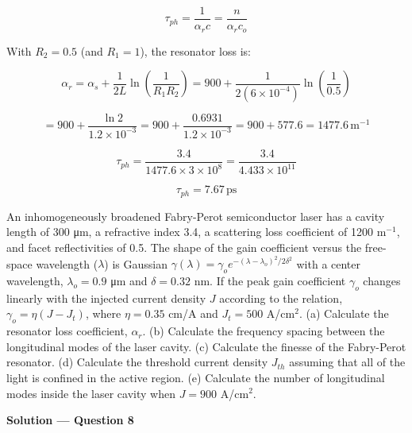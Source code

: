 \begin{equation*}
  \tau_{ph} = \frac{1}{\alpha_r c} = \frac{n}{\alpha_r c_o}
\end{equation*}

With $R_2 = 0.5$ (and $R_1 = 1$), the resonator loss is:

\begin{equation*}
  \alpha_r = \alpha_s + \frac{1}{2L}\ln\!\left(\frac{1}{R_1 R_2}\right) = 900 + \frac{1}{2(6\times10^{-4})}\ln\!\left(\frac{1}{0.5}\right)
\end{equation*}

\begin{equation*}
  = 900 + \frac{\ln 2}{1.2\times10^{-3}} = 900 + \frac{0.6931}{1.2\times10^{-3}} = 900 + 577.6 = 1477.6\,\text{m}^{-1}
\end{equation*}

\begin{equation*}
  \tau_{ph} = \frac{3.4}{1477.6 \times 3\times10^8} = \frac{3.4}{4.433\times10^{11}}
\end{equation*}

\begin{equation*}
  \boxed{\tau_{ph} = 7.67\,\text{ps}}
\end{equation*}

\begin{question}[Question 8]
An inhomogeneously broadened Fabry-Perot semiconductor laser has a cavity length of 300 \si{\micro\meter}, a refractive index 3.4, a scattering loss coefficient of 1200 m$^{-1}$, and facet reflectivities of 0.5. The shape of the gain coefficient versus the free-space wavelength ($\lambda$) is Gaussian $\gamma(\lambda) = \gamma_o e^{-(\lambda - \lambda_o)^2 / 2\delta^2}$ with a center wavelength, $\lambda_o = 0.9$ \si{\micro\meter} and $\delta = 0.32$ nm. If the peak gain coefficient $\gamma_o$ changes linearly with the injected current density $J$ according to the relation, $\gamma_o = \eta(J - J_t)$, where $\eta = 0.35$ cm/A and $J_t = 500$ A/cm$^2$. (a) Calculate the resonator loss coefficient, $\alpha_r$. (b) Calculate the frequency spacing between the longitudinal modes of the laser cavity. (c) Calculate the finesse of the Fabry-Perot resonator. (d) Calculate the threshold current density $J_{th}$ assuming that all of the light is confined in the active region. (e) Calculate the number of longitudinal modes inside the laser cavity when $J = 900$ A/cm$^2$.
\end{question}

\textbf{\large Solution --- Question 8}

